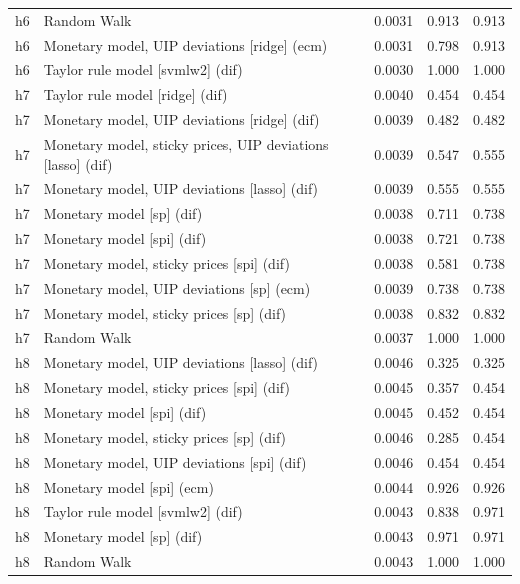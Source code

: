 \begin{ThreePartTable}
\begin{longtable}[t]{cp{5.5cm}ccc}
h6 & \raggedright Random Walk & 0.0031 & 0.913 & 0.913\\
h6 & \raggedright Monetary model, UIP deviations [ridge] (ecm) & 0.0031 & 0.798 & 0.913\\
h6 & \raggedright Taylor rule model [svmlw2] (dif) & 0.0030 & 1.000 & 1.000\\
\addlinespace
h7 & \raggedright Taylor rule model [ridge] (dif) & 0.0040 & 0.454 & 0.454\\
h7 & \raggedright Monetary model, UIP deviations [ridge] (dif) & 0.0039 & 0.482 & 0.482\\
h7 & \raggedright Monetary model, sticky prices, UIP deviations [lasso] (dif) & 0.0039 & 0.547 & 0.555\\
h7 & \raggedright Monetary model, UIP deviations [lasso] (dif) & 0.0039 & 0.555 & 0.555\\
h7 & \raggedright Monetary model [sp] (dif) & 0.0038 & 0.711 & 0.738\\
h7 & \raggedright Monetary model [spi] (dif) & 0.0038 & 0.721 & 0.738\\
h7 & \raggedright Monetary model, sticky prices [spi] (dif) & 0.0038 & 0.581 & 0.738\\
h7 & \raggedright Monetary model, UIP deviations [sp] (ecm) & 0.0039 & 0.738 & 0.738\\
h7 & \raggedright Monetary model, sticky prices [sp] (dif) & 0.0038 & 0.832 & 0.832\\
h7 & \raggedright Random Walk & 0.0037 & 1.000 & 1.000\\
\addlinespace
h8 & \raggedright Monetary model, UIP deviations [lasso] (dif) & 0.0046 & 0.325 & 0.325\\
h8 & \raggedright Monetary model, sticky prices [spi] (dif) & 0.0045 & 0.357 & 0.454\\
h8 & \raggedright Monetary model [spi] (dif) & 0.0045 & 0.452 & 0.454\\
h8 & \raggedright Monetary model, sticky prices [sp] (dif) & 0.0046 & 0.285 & 0.454\\
h8 & \raggedright Monetary model, UIP deviations [spi] (dif) & 0.0046 & 0.454 & 0.454\\
h8 & \raggedright Monetary model [spi] (ecm) & 0.0044 & 0.926 & 0.926\\
h8 & \raggedright Taylor rule model [svmlw2] (dif) & 0.0043 & 0.838 & 0.971\\
h8 & \raggedright Monetary model [sp] (dif) & 0.0043 & 0.971 & 0.971\\
h8 & \raggedright Random Walk & 0.0043 & 1.000 & 1.000\\

\end{longtable}
\end{ThreePartTable}
